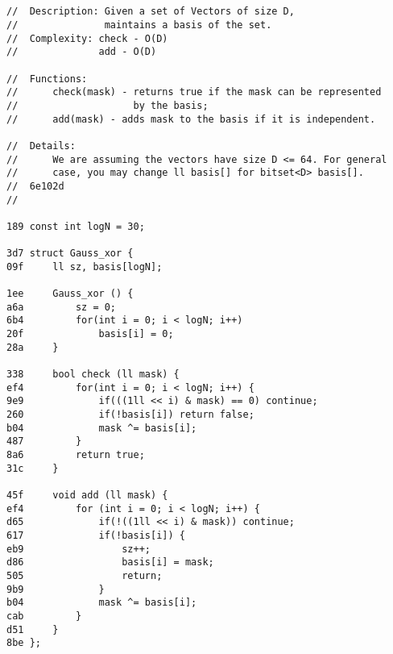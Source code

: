 \documentclass[11pt, a4paper, twoside]{article}
\begin{document}
\subsection{}
\begin{lstlisting}
//  Description: Given a set of Vectors of size D,
//               maintains a basis of the set.
//  Complexity: check - O(D)
//              add - O(D)

//  Functions:
//      check(mask) - returns true if the mask can be represented
//                    by the basis;
//      add(mask) - adds mask to the basis if it is independent.

//  Details:
//      We are assuming the vectors have size D <= 64. For general
//      case, you may change ll basis[] for bitset<D> basis[].
//  6e102d
//

189 const int logN = 30;

3d7 struct Gauss_xor {
09f     ll sz, basis[logN];
    
1ee     Gauss_xor () {
a6a         sz = 0;
6b4         for(int i = 0; i < logN; i++)
20f             basis[i] = 0;
28a     }
    
338     bool check (ll mask) {
ef4         for(int i = 0; i < logN; i++) {
9e9             if(((1ll << i) & mask) == 0) continue;
260             if(!basis[i]) return false;
b04             mask ^= basis[i];
487         }
8a6         return true;
31c     }
    
45f     void add (ll mask) {
ef4         for (int i = 0; i < logN; i++) {
d65             if(!((1ll << i) & mask)) continue;
617             if(!basis[i]) {
eb9                 sz++;
d86                 basis[i] = mask;
505                 return;
9b9             }
b04             mask ^= basis[i];
cab         }
d51     }
8be };
\end{lstlisting}
\end{document}
